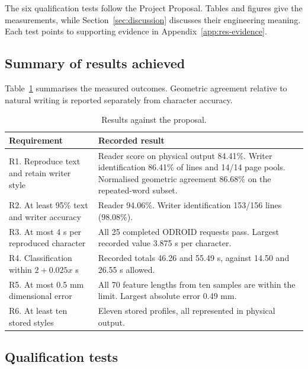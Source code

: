 \begingroup
\raggedbottom
\setlength{\textfloatsep}{12pt}
\setlength{\intextsep}{12pt}
\renewcommand{\resstep}[1]{\par\smallskip\noindent\QualificationSection{#1}\par\nobreak\smallskip}
\label{sec:results}
The six qualification tests follow the Project Proposal. Tables and figures give the measurements, while Section~\ref{sec:discussion} discusses their engineering meaning. Each test points to supporting evidence in Appendix~\ref{app:res-evidence}.

\subsection{Summary of results achieved}
\label{sec:res-summary}
Table~\ref{tab:res-summary} summarises the measured outcomes. Geometric agreement relative to natural writing is reported separately from character accuracy.
\begin{table}[H]\centering\small
\begin{tabularx}{\linewidth}{p{.25\linewidth}X}\toprule
Requirement & Recorded result\\\midrule
R1. Reproduce text and retain writer style & Reader score on physical output 84.41\%. Writer identification 86.41\% of lines and 14/14 page pools. Normalised geometric agreement 86.68\% on the repeated-word subset.\\[3pt]
R2. At least 95\% text and writer accuracy & Reader 94.06\%. Writer identification 153/156 lines (98.08\%).\\[3pt]
R3. At most 4 s per reproduced character & All 25 completed ODROID requests pass. Largest recorded value 3.875 s per character.\\[3pt]
R4. Classification within $2+0.025x$ s & Recorded totals 46.26 and 55.49 s, against 14.50 and 26.55 s allowed.\\[3pt]
R5. At most 0.5 mm dimensional error & All 70 feature lengths from ten samples are within the limit. Largest absolute error 0.49 mm.\\[3pt]
R6. At least ten stored styles & Eleven stored profiles, all represented in physical output.\\\bottomrule
\end{tabularx}
\caption{Results against the proposal.}\label{tab:res-summary}
\end{table}
\FloatBarrier

\subsection{Qualification tests}
\label{sec:res-qtp}
